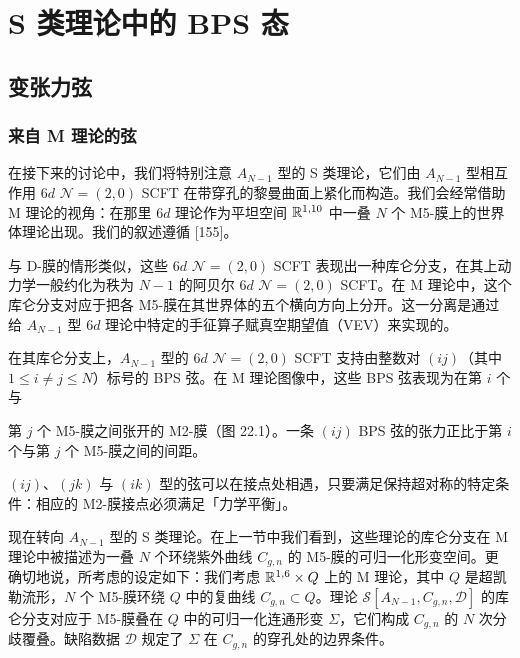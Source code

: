 \chapter{S 类理论中的 BPS 态}


\section{变张力弦}

\subsection{来自 M 理论的弦}

在接下来的讨论中，我们将特别注意 $A_{N-1}$ 型的 S 类理论，它们由 $A_{N-1}$ 型相互作用 $6d$ $\mathcal{N}=(2,0)$ SCFT 在带穿孔的黎曼曲面上紧化而构造。我们会经常借助 M 理论的视角：在那里 $6d$ 理论作为平坦空间 $\mathbb{R}^{1,10}$ 中一叠 $N$ 个 M5-膜上的世界体理论出现。我们的叙述遵循 [155]。

与 D-膜的情形类似，这些 $6d$ $\mathcal{N}=(2,0)$ SCFT 表现出一种库仑分支，在其上动力学一般约化为秩为 $N-1$ 的阿贝尔 $6d$ $\mathcal{N}=(2,0)$ SCFT。在 M 理论中，这个库仑分支对应于把各 M5-膜在其世界体的五个横向方向上分开。这一分离是通过给 $A_{N-1}$ 型 $6d$ 理论中特定的手征算子赋真空期望值（VEV）来实现的。

在其库仑分支上，$A_{N-1}$ 型的 $6d$ $\mathcal{N}=(2,0)$ SCFT 支持由整数对 $(ij)$（其中 $1\le i\ne j\le N$）标号的 BPS 弦。在 M 理论图像中，这些 BPS 弦表现为在第 $i$ 个与

第 $j$ 个 M5-膜之间张开的 M2-膜（图 22.1）。一条 $(ij)$ BPS 弦的张力正比于第 $i$ 个与第 $j$ 个 M5-膜之间的间距。


$(ij)$、$(jk)$ 与 $(ik)$ 型的弦可以在接点处相遇，只要满足保持超对称的特定条件：相应的 M2-膜接点必须满足「力学平衡」。

现在转向 $A_{N-1}$ 型的 S 类理论。在上一节中我们看到，这些理论的库仑分支在 M 理论中被描述为一叠 $N$ 个环绕紫外曲线 $C_{g,n}$ 的 M5-膜的可归一化形变空间。更确切地说，所考虑的设定如下：我们考虑 $\mathbb{R}^{1,6}\times Q$ 上的 M 理论，其中 $Q$ 是超凯勒流形，$N$ 个 M5-膜环绕 $Q$ 中的复曲线 $C_{g,n}\subset Q$。理论 $\mathcal{S}[A_{N-1},C_{g,n},\mathcal{D}]$ 的库仑分支对应于 M5-膜叠在 $Q$ 中的可归一化连通形变 $\Sigma$，它们构成 $C_{g,n}$ 的 $N$ 次分歧覆叠。缺陷数据 $\mathcal{D}$ 规定了 $\Sigma$ 在 $C_{g,n}$ 的穿孔处的边界条件。

